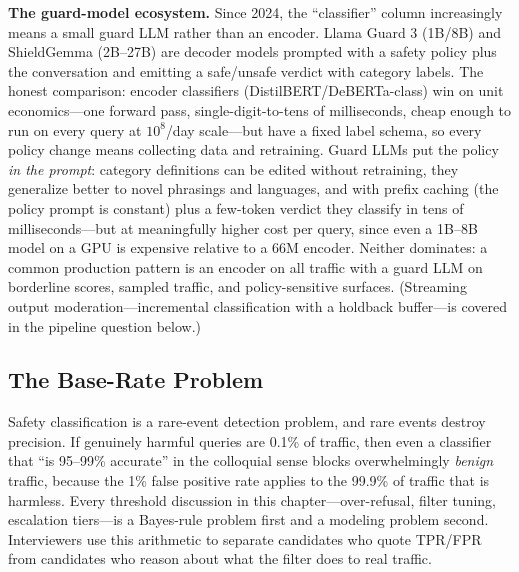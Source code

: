 \textbf{The guard-model ecosystem.} Since 2024, the ``classifier'' column increasingly means a small guard LLM rather than an encoder. Llama Guard 3 (1B/8B) and ShieldGemma (2B--27B) are decoder models prompted with a safety policy plus the conversation and emitting a safe/unsafe verdict with category labels. The honest comparison: encoder classifiers (DistilBERT/DeBERTa-class) win on unit economics---one forward pass, single-digit-to-tens of milliseconds, cheap enough to run on every query at $10^8$/day scale---but have a fixed label schema, so every policy change means collecting data and retraining. Guard LLMs put the policy \textit{in the prompt}: category definitions can be edited without retraining, they generalize better to novel phrasings and languages, and with prefix caching (the policy prompt is constant) plus a few-token verdict they classify in tens of milliseconds---but at meaningfully higher cost per query, since even a 1B--8B model on a GPU is expensive relative to a 66M encoder. Neither dominates: a common production pattern is an encoder on all traffic with a guard LLM on borderline scores, sampled traffic, and policy-sensitive surfaces. (Streaming output moderation---incremental classification with a holdback buffer---is covered in the pipeline question below.)

\subsection{The Base-Rate Problem}
\label{sec:base_rates_safety}

\begin{keyinsight}
Safety classification is a rare-event detection problem, and rare events destroy precision. If genuinely harmful queries are 0.1\% of traffic, then even a classifier that ``is 95--99\% accurate'' in the colloquial sense blocks overwhelmingly \textit{benign} traffic, because the 1\% false positive rate applies to the 99.9\% of traffic that is harmless. Every threshold discussion in this chapter---over-refusal, filter tuning, escalation tiers---is a Bayes-rule problem first and a modeling problem second. Interviewers use this arithmetic to separate candidates who quote TPR/FPR from candidates who reason about what the filter does to real traffic.
\end{keyinsight}

